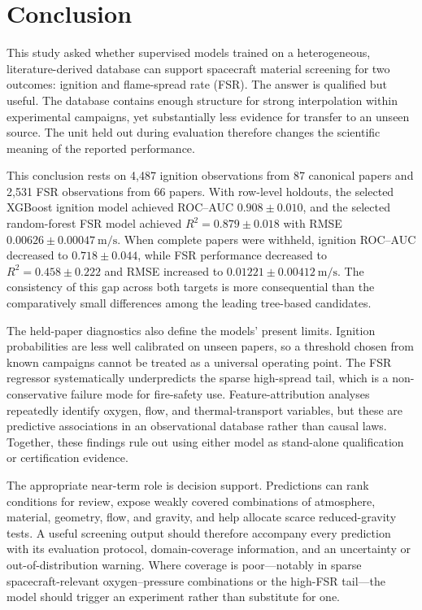 \chapter{Conclusion}
\label{chap:conclusion}

This study asked whether supervised models trained on a heterogeneous,
literature-derived database can support spacecraft material screening for two
outcomes: ignition and flame-spread rate (FSR). The answer is qualified but
useful. The database contains enough structure for strong interpolation within
experimental campaigns, yet substantially less evidence for transfer to an
unseen source. The unit held out during evaluation therefore changes the
scientific meaning of the reported performance.

This conclusion rests on 4,487 ignition observations from 87 canonical papers
and 2,531 FSR observations from 66 papers. With row-level holdouts, the selected
XGBoost ignition model achieved ROC--AUC \(0.908\pm0.010\), and the selected
random-forest FSR model achieved \(R^2=0.879\pm0.018\) with RMSE
\(0.00626\pm0.00047~\si{\metre\per\second}\). When complete papers were
withheld, ignition ROC--AUC decreased to \(0.718\pm0.044\), while FSR
performance decreased to \(R^2=0.458\pm0.222\) and RMSE increased to
\(0.01221\pm0.00412~\si{\metre\per\second}\). The consistency of this gap
across both targets is more consequential than the comparatively small
differences among the leading tree-based candidates.

The held-paper diagnostics also define the models' present limits. Ignition
probabilities are less well calibrated on unseen papers, so a threshold chosen
from known campaigns cannot be treated as a universal operating point. The FSR
regressor systematically underpredicts the sparse high-spread tail, which is a
non-conservative failure mode for fire-safety use. Feature-attribution analyses
repeatedly identify oxygen, flow, and thermal-transport variables, but these are
predictive associations in an observational database rather than causal laws.
Together, these findings rule out using either model as stand-alone
qualification or certification evidence.

The appropriate near-term role is decision support. Predictions can rank
conditions for review, expose weakly covered combinations of atmosphere,
material, geometry, flow, and gravity, and help allocate scarce reduced-gravity
tests. A useful screening output should therefore accompany every prediction
with its evaluation protocol, domain-coverage information, and an uncertainty
or out-of-distribution warning. Where coverage is poor---notably in sparse
spacecraft-relevant oxygen--pressure combinations or the high-FSR tail---the
model should trigger an experiment rather than substitute for one.

